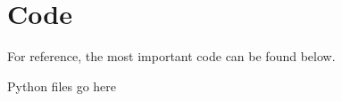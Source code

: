 \newpage
\section{Code}
\label{apx:code}
For reference, the most important code can be found below.

Python files go here

